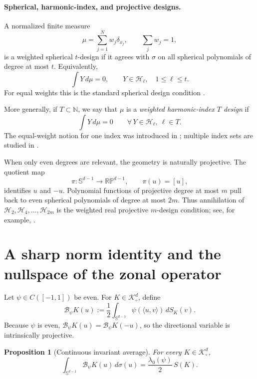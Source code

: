 \documentclass[12pt,a4paper]{article}
\newcommand{\Sph}{\mathbb S}
\newcommand{\RP}{\mathbb{RP}}
\newcommand{\N}{\mathbb N}
\newcommand{\K}{\mathcal K}
\newcommand{\Harm}{\mathcal H}
\newcommand{\cB}{\mathcal B}
\theoremstyle{plain}
\newtheorem{proposition}[theorem]{Proposition}
\theoremstyle{definition}
\begin{document}
\paragraph{Spherical, harmonic-index, and projective designs.}

A normalized finite measure
\[
 \mu=\sum_{j=1}^Nw_j\delta_{x_j},\qquad \sum_jw_j=1,
\]
is a weighted spherical $t$-design if it agrees with $\sigma$ on all spherical polynomials of degree at most $t$.  Equivalently,
\begin{equation}\label{eq:spherical-design-harm}
 \int Y\,d\mu=0,
 \qquad Y\in\Harm_\ell,
 \quad 1\le\ell\le t.
\end{equation}
For equal weights this is the standard spherical design condition \cite{DGS,Seidel}.

More generally, if $T\subset\N$, we say that $\mu$ is a \emph{weighted harmonic-index $T$ design} if
\begin{equation}\label{eq:Tdesign}
 \int Y\,d\mu=0
 \qquad \forall\,Y\in\Harm_\ell,\ \ell\in T.
\end{equation}
The equal-weight notion for one index was introduced in \cite{BOT}; multiple index sets are studied in \cite{ZhuEtAl}.

When only even degrees are relevant, the geometry is naturally projective.  The quotient map
\[
 \pi:\Sph^{d-1}\to\RP^{d-1},\qquad \pi(u)=[u],
\]
identifies $u$ and $-u$.  Polynomial functions of projective degree at most $m$ pull back to even spherical polynomials of degree at most $2m$.  Thus annihilation of $\Harm_2,\Harm_4,\ldots,\Harm_{2m}$ is the weighted real projective $m$-design condition; see, for example, \cite{Lyubich2009,Lindblad}.

\section{A sharp norm identity and the nullspace of the zonal operator}

Let $\psi\in C([-1,1])$ be even.  For $K\in\K^d_\circ$, define
\begin{equation}\label{eq:Bpsi}
 \cB_\psi K(u)
 :=\frac12\int_{\Sph^{d-1}}\psi(\langle u,v\rangle)\,dS_K(v).
\end{equation}
Because $\psi$ is even, $\cB_\psi K(u)=\cB_\psi K(-u)$, so the directional variable is intrinsically projective.

\begin{proposition}[Continuous invariant average]\label{prop:continuous-average}
For every $K\in\K^d_\circ$,
\begin{equation}\label{eq:continuous-average}
 \int_{\Sph^{d-1}}\cB_\psi K(u)\,d\sigma(u)
 =\frac{\lambda_0(\psi)}2\,S(K).
\end{equation}
\end{proposition}
\end{document}
